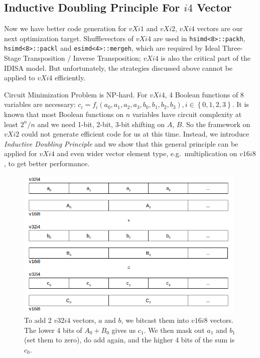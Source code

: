 \subsection{Inductive Doubling Principle For $i4$ Vector}
Now we have better code generation for $vXi1$ and $vXi2$, $vXi4$ vectors are our next optimization target. Shufflevectors of $vXi4$ are used in \verb|hsimd<8>::packh|, \verb|hsimd<8>::packl| and \verb|esimd<4>::mergeh|, which are required by Ideal Three-Stage Transposition / Inverse Transposition; $vXi4$ is also the critical part of the IDISA model. But unfortunately, the strategies discussed above cannot be applied to $vXi4$ efficiently.

Circuit Minimization Problem is NP-hard\cite{quine1952problem, kabanets2000circuit}. For $vXi4$, 4 Boolean functions of 8 variables are necessary: $c_i = f_i(a_0, a_1, a_2, a_3, b_0, b_1, b_2, b_3), i \in \left\{{0, 1, 2, 3}\right\}$. It is known that most Boolean functions on $n$ variables have circuit complexity at least $2^n/n$\cite{kabanets2000circuit} and we need 1-bit, 2-bit, 3-bit shifting on $A$, $B$. So the framework on $vXi2$ could not generate efficient code for us at this time. Instead, we introduce \textit{Inductive Doubling Principle} \cite{inductive_doubling_principle} and we show that this general principle can be applied for $vXi4$ and even wider vector element type, e.g.\ multiplication on $v16i8$, to get better performance.

\begin{figure}[ht!]
\centering
\includegraphics[width=110mm]{draw/add_4.png}
\caption[Addition of two $v32i4$ vectors.]{To add 2 $v32i4$ vectors, $a$ and $b$, we bitcast them into $v16i8$ vectors. The lower 4 bits of $A_0 + B_0$ gives us $c_1$. We then mask out $a_1$ and $b_1$ (set them to zero), do add again, and the higher 4 bits of the sum is $c_0$.}
\label{figure:add_4}
\end{figure}

